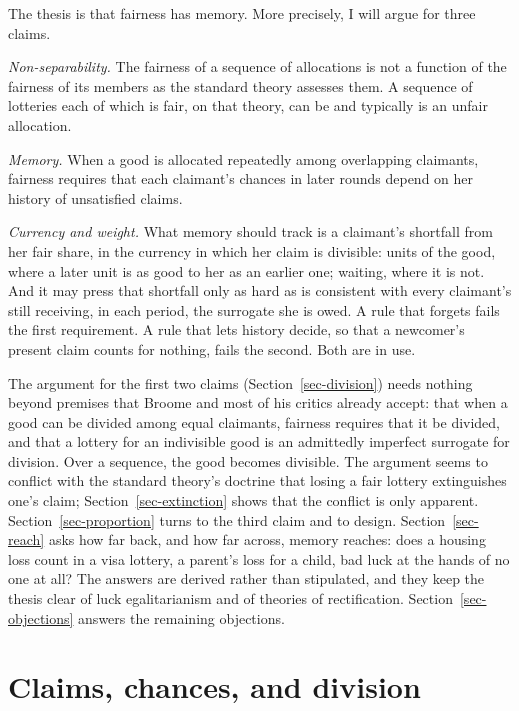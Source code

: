 \documentclass[
  11pt,
  letterpaper,
  DIV=11,
  numbers=noendperiod,
  twoside]{scrartcl}
\begin{document}
The thesis is that fairness has memory. More precisely, I will argue for
three claims.

\emph{Non-separability.} The fairness of a sequence of allocations is
not a function of the fairness of its members as the standard theory
assesses them. A sequence of lotteries each of which is fair, on that
theory, can be and typically is an unfair allocation.

\emph{Memory.} When a good is allocated repeatedly among overlapping
claimants, fairness requires that each claimant's chances in later
rounds depend on her history of unsatisfied claims.

\emph{Currency and weight.} What memory should track is a claimant's
shortfall from her fair share, in the currency in which her claim is
divisible: units of the good, where a later unit is as good to her as an
earlier one; waiting, where it is not. And it may press that shortfall
only as hard as is consistent with every claimant's still receiving, in
each period, the surrogate she is owed. A rule that forgets fails the
first requirement. A rule that lets history decide, so that a newcomer's
present claim counts for nothing, fails the second. Both are in use.

The argument for the first two claims (Section~\ref{sec-division}) needs
nothing beyond premises that Broome and most of his critics already
accept: that when a good can be divided among equal claimants, fairness
requires that it be divided, and that a lottery for an indivisible good
is an admittedly imperfect surrogate for division. Over a sequence, the
good becomes divisible. The argument seems to conflict with the standard
theory's doctrine that losing a fair lottery extinguishes one's claim;
Section~\ref{sec-extinction} shows that the conflict is only apparent.
Section~\ref{sec-proportion} turns to the third claim and to design.
Section~\ref{sec-reach} asks how far back, and how far across, memory
reaches: does a housing loss count in a visa lottery, a parent's loss
for a child, bad luck at the hands of no one at all? The answers are
derived rather than stipulated, and they keep the thesis clear of luck
egalitarianism and of theories of rectification.
Section~\ref{sec-objections} answers the remaining objections.

\section{Claims, chances, and division}\label{sec-broome}
\end{document}
